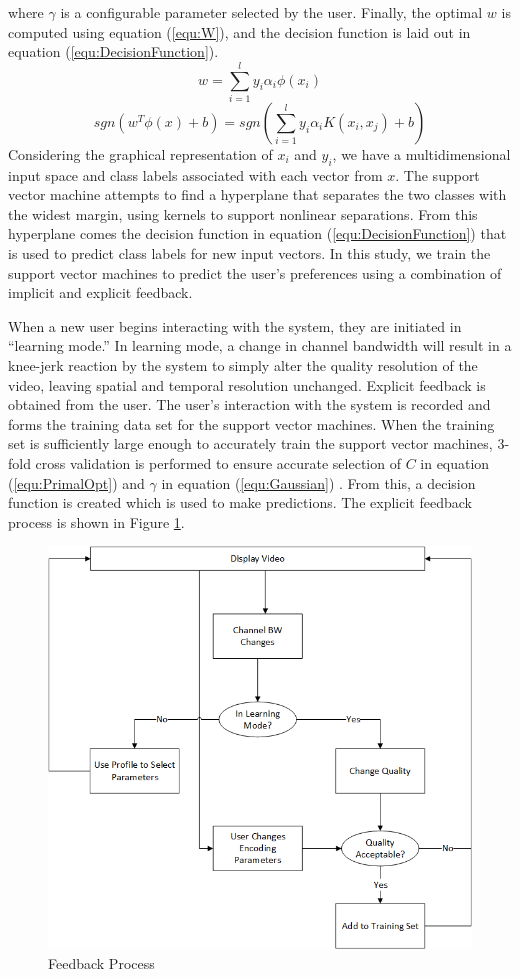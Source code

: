\documentclass[3p,times,procedia]{elsarticle}
\begin{document}
where $\gamma$ is a configurable parameter selected by the user. Finally, the optimal $w$ is computed using equation (\ref{equ:W}), and the decision function is laid out in equation (\ref{equ:DecisionFunction}).
\begin{equation}
\label{equ:W}
w = \sum_{i=1}^{l} y_i \alpha_i \phi (x_i)
\end{equation}
\begin{equation}
\label{equ:DecisionFunction}
sgn(w^T\phi (x) + b) = sgn(\sum_{i=1}^{l} y_i\alpha_i K(x_i, x_j) +b)
\end{equation}
Considering the graphical representation of $x_i$ and $y_i$, we have a multidimensional input space and class labels associated with each vector from $x$. The support vector machine attempts to find a hyperplane that separates the two classes with the widest margin, using kernels to support nonlinear separations. From this hyperplane comes the decision function in equation (\ref{equ:DecisionFunction}) that is used to predict class labels for new input vectors. In this study, we train the support vector machines to predict the user’s preferences using a combination of implicit and explicit feedback. 

When a new user begins interacting with the system, they are initiated in ``learning mode.'' In learning mode, a change in channel bandwidth will result in a knee-jerk reaction by the system to simply alter the quality resolution of the video, leaving spatial and temporal resolution unchanged. Explicit feedback is obtained from the user. The user's interaction with the system is recorded and forms the training data set for the support vector machines. When the training set is sufficiently large enough to accurately train the support vector machines, 3-fold cross validation is performed to ensure accurate selection of $C$ in equation (\ref{equ:PrimalOpt}) and $\gamma$ in equation (\ref{equ:Gaussian}) \cite{LibSVM}. From this, a decision function is created which is used to make predictions. The explicit feedback process is shown in Figure \ref{fig:Feedback}.
\begin{figure}[H]
\centering
\includegraphics[width=0.5\linewidth]{BandwidthChangeDecisionTree.png}
\caption{Feedback Process}
\label{fig:Feedback}
\end{figure}
\end{document}

